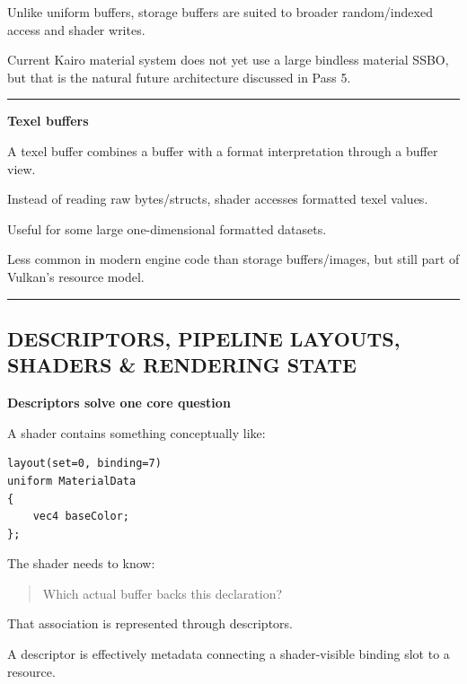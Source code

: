 Unlike uniform buffers, storage buffers are suited to broader random/indexed access and shader writes.

Current Kairo material system does not yet use a large bindless material SSBO, but that is the natural future architecture discussed in Pass 5.

\begin{center}\rule{0.5\linewidth}{0.5pt}\end{center}

\textbf{Texel buffers}

A texel buffer combines a buffer with a format interpretation through a buffer view.

Instead of reading raw bytes/structs, shader accesses formatted texel values.

Useful for some large one-dimensional formatted datasets.

Less common in modern engine code than storage buffers/images, but still part of Vulkan's resource model.

\begin{center}\rule{0.5\linewidth}{0.5pt}\end{center}

\subsection{DESCRIPTORS, PIPELINE LAYOUTS, SHADERS \& RENDERING STATE}\label{01-foundations-i-ch013-descriptors-pipeline-layouts-shaders-rendering-state}

\hypertarget{01-foundations-i-ch013-descriptors-pipeline-layouts-shaders-rendering-state}{}

\textbf{Descriptors solve one core question}

A shader contains something conceptually like:

\begin{verbatim}
layout(set=0, binding=7)
uniform MaterialData
{
    vec4 baseColor;
};
\end{verbatim}

The shader needs to know:

\begin{quote}
Which actual buffer backs this declaration?
\end{quote}

That association is represented through descriptors.

A descriptor is effectively metadata connecting a shader-visible binding slot to a resource.

